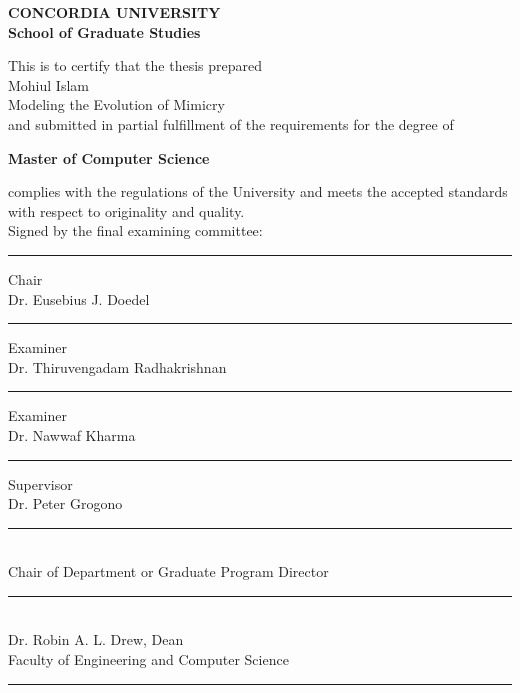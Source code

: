 \begin{titlepage}
\begin{center}
\Large \textbf{CONCORDIA UNIVERSITY}\\
\Large \textbf{School of Graduate Studies}\\[1cm]
\end{center}
This is to certify that the thesis prepared\\
 Mohiul Islam\\
  Modeling the Evolution of Mimicry\\
and submitted in partial fulfillment of the requirements for the degree of
\begin{center}
\small \textbf{Master of Computer Science}\\
\end{center}
complies with the regulations of the University and meets the accepted standards with respect to originality and quality.\\[0.4cm]
Signed by the final examining committee:\\[0.5cm]
\makebox[5cm][l]{} \rule{7cm}{0.1mm} Chair\\ 
\makebox[5cm][l]{} Dr. Eusebius J. Doedel\\[0.5cm]
\makebox[5cm][l]{} \rule{7cm}{0.1mm} Examiner\\ 
\makebox[5cm][l]{} Dr. Thiruvengadam Radhakrishnan\\[0.5cm]
\makebox[5cm][l]{} \rule{7cm}{0.1mm} Examiner\\ 
\makebox[5cm][l]{} Dr. Nawwaf Kharma\\[0.5cm]
\makebox[5cm][l]{} \rule{7cm}{0.1mm} Supervisor\\ 
\makebox[5cm][l]{} Dr. Peter Grogono\\[0.5cm]
 \rule{10cm}{0.1mm}\\ 
\makebox[5cm][l]{} Chair of Department or Graduate Program Director\\[0.5cm]
\makebox[5cm][l]{} \rule{10cm}{0.1mm}\\ 
\makebox[5cm][l]{} Dr. Robin A. L. Drew, Dean \\
\makebox[5cm][l]{} Faculty of Engineering and Computer Science\\[0.5cm]
 \rule{7cm}{0.1mm}

\end{titlepage}